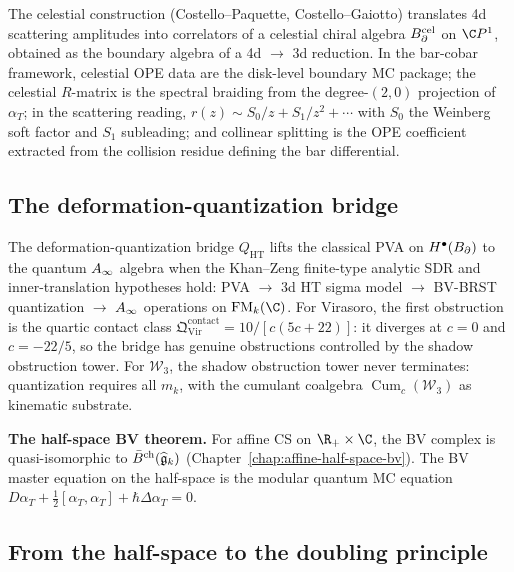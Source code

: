 The celestial construction (Costello--Paquette, Costello--Gaiotto)
translates 4d scattering amplitudes into correlators of a
celestial chiral algebra $B_{\partial}^{\mathrm{cel}}$ on $\C P^1$,
obtained as the boundary algebra of a 4d $\to$ 3d reduction.
In the bar-cobar framework, celestial OPE data are the disk-level
boundary MC package; the celestial $R$-matrix is the spectral
braiding from the degree-$(2,0)$ projection of $\alpha_T$; in the
scattering reading, $r(z) \sim S_0/z + S_1/z^2 + \cdots$ with
$S_0$ the Weinberg soft factor and $S_1$ subleading; and
collinear splitting is the OPE coefficient extracted from the
collision residue defining the bar differential.

\subsection*{The deformation-quantization bridge}

The deformation-quantization bridge
$Q_{\mathrm{HT}}$ lifts the classical PVA on $H^\bullet(B_{\partial})$
to the quantum $A_\infty$ algebra when the Khan--Zeng finite-type
analytic SDR and inner-translation hypotheses hold:
PVA $\to$ 3d HT sigma model $\to$ BV-BRST quantization $\to$
$A_\infty$ operations on $\FM_k(\C)$.
For Virasoro, the first obstruction is the quartic contact class
$\mathfrak{Q}^{\mathrm{contact}}_{\mathrm{Vir}} =
10/[c(5c+22)]$: it diverges at $c = 0$ and $c = -22/5$, so the
bridge has genuine obstructions controlled by the shadow obstruction
tower. For $\mathcal{W}_3$, the shadow obstruction tower never terminates:
quantization requires all $m_k$, with the cumulant coalgebra
$\operatorname{Cum}_c(\mathcal{W}_3)$ as kinematic substrate.

\medskip
\noindent\textbf{The half-space BV theorem.}\enspace
For affine CS on $\R_+ \times \C$, the BV complex is
quasi-isomorphic to $\bar{B}^{\mathrm{ch}}(\widehat{\mathfrak{g}}_k)$
(Chapter~\ref{chap:affine-half-space-bv}).
The BV master equation on the half-space is the modular quantum MC
equation $D\alpha_T + \tfrac{1}{2}[\alpha_T, \alpha_T] +
\hbar\Delta\alpha_T = 0$.

\subsection*{From the half-space to the doubling principle}

